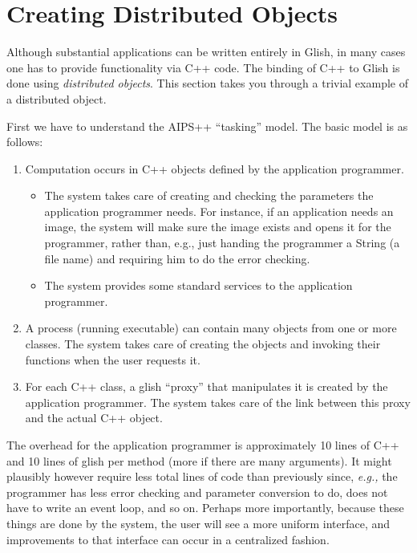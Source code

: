 \section{Creating Distributed Objects}
\label{sec:creatingDOs}

Although substantial applications can be written entirely in Glish, in
many cases one has to provide functionality via C++ code.  The binding
of C++ to Glish is done using {\em distributed objects}. This section
takes you through a trivial example of a distributed object.

First we have to understand the AIPS++ ``tasking'' model.  The basic
model is as follows:
\begin{enumerate}
    \item Computation occurs in C++ objects defined by the application
          programmer.
     \begin{itemize}
         \item The system takes care of creating and checking the 
               parameters the application programmer needs. For instance,
               if an application needs an image, the system will make sure
               the image exists and opens it for the programmer, rather
               than, e.g., just handing the programmer a String (a file name)
               and requiring him to do the error checking.
         \item The system provides some standard services to the application
               programmer.
     \end{itemize}
    \item A process (running executable) can contain many objects from
          one or more classes. The system takes care of creating the
          objects and invoking their functions when the user requests
          it.
    \item For each C++ class, a glish ``proxy'' that manipulates it
          is created by the application programmer. The system takes
          care of the link between this proxy and the actual C++ object.
\end{enumerate}

The overhead for the application programmer is approximately 10 lines
of C++ and 10 lines of glish per method (more if there are many
arguments). It might plausibly however require less total lines of
code than previously since, {\em e.g.,} the programmer has less error
checking and parameter conversion to do, does not have to write an
event loop, and so on. Perhaps more importantly, because these things
are done by the system, the user will see a more uniform interface,
and improvements to that interface can occur in a centralized fashion.

